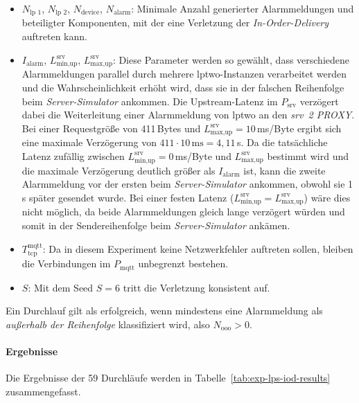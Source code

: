\begin{itemize}
	\item $N_{\text{lp~1}}$, $N_{\text{lp~2}}$, $N_{\text{device}}$, $N_{\text{alarm}}$: Minimale Anzahl generierter Alarmmeldungen und beteiligter Komponenten, mit der eine Verletzung der \textit{In-Order-Delivery} auftreten kann.

	\item $I_{\text{alarm}}$, $L_{\text{min,up}}^{\text{srv}}$, $L_{\text{max,up}}^{\text{srv}}$: Diese Parameter werden so gewählt, dass verschiedene Alarmmeldungen parallel durch mehrere \gls{lptwo}-Instanzen verarbeitet werden und die Wahrscheinlichkeit erhöht wird, dass sie in der falschen Reihenfolge beim \textit{Server-Simulator} ankommen. Die Upstream-Latenz im $P_{\text{srv}}$ verzögert dabei die Weiterleitung einer Alarmmeldung von \gls{lptwo} an den \textit{\gls{srv}~2 PROXY}. Bei einer Requestgröße von 411\,Bytes und $L_{\text{max,up}}^{\text{srv}} = 10$\,ms/Byte ergibt sich eine maximale Verzögerung von $411 \cdot 10\,\text{ms} = 4{,}11$\,s. Da die tatsächliche Latenz zufällig zwischen $L_{\text{min,up}}^{\text{srv}} = 0$\,ms/Byte und $L_{\text{max,up}}^{\text{srv}}$ bestimmt wird und die maximale Verzögerung deutlich größer als $I_{\text{alarm}}$ ist, kann die zweite Alarmmeldung vor der ersten beim \textit{Server-Simulator} ankommen, obwohl sie 1\,s später gesendet wurde. Bei einer festen Latenz ($L_{\text{min,up}}^{\text{srv}} = L_{\text{max,up}}^{\text{srv}}$) wäre dies nicht möglich, da beide Alarmmeldungen gleich lange verzögert würden und somit in der Sendereihenfolge beim \textit{Server-Simulator} ankämen.

	\item $T_{\text{tcp}}^{\text{mqtt}}$: Da in diesem Experiment keine Netzwerkfehler auftreten sollen, bleiben die Verbindungen im $P_{\text{mqtt}}$ unbegrenzt bestehen.

	\item $S$: Mit dem Seed $S = 6$ tritt die Verletzung konsistent auf.
\end{itemize}

Ein Durchlauf gilt als erfolgreich, wenn mindestens eine Alarmmeldung als \textit{außerhalb der Reihenfolge} klassifiziert wird, also $N_{\text{ooo}} > 0$.

\paragraph{Ergebnisse} Die Ergebnisse der 59 Durchläufe werden in Tabelle~\ref{tab:exp-lps-iod-results} zusammengefasst.

